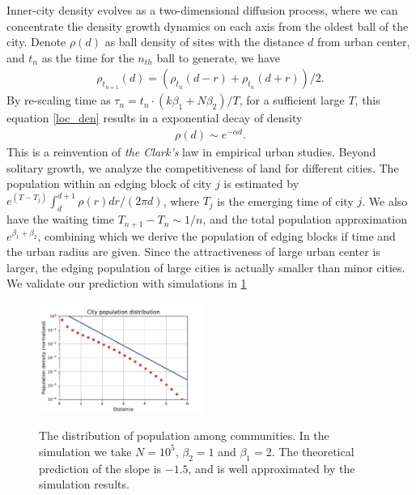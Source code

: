 \documentclass[reprint,unsortedaddress,amsmath,amssymb,floatfix,aps,prl,showkeys]{revtex4-2}
\begin{document}

Inner-city density evolves as a two-dimensional diffusion process, where we can concentrate the density growth dynamics on each axis from the oldest ball of the city. Denote $\rho(d)$ as ball density of sites with the distance $d$ from urban center, and $t_n$ as the time for the $n_{th}$ ball to generate, we have \begin{align}\rho_{t_{n+1}}(d) = (\rho_{t_{n}}(d-r) + \rho_{t_{n}}(d+r) )/2.\label{loc_den}\end{align} By re-scaling time as $\tau_n = t_n\cdot (k\beta_1+N\beta_2)/T$, for a sufficient large $T$, this equation \ref{loc_den} results in a exponential decay of density
    \begin{align}
        \rho(d)\sim e^{-\alpha d}\label{clark_eq}.
    \end{align}
This is a reinvention of \emph{the Clark's} law in empirical urban studies\cite{clark1951urban}. Beyond solitary growth, we analyze the competitiveness of land for different cities. The population within an edging block of city $j$ is estimated by $e^{(T-T_j)}\int_{d}^{d+1}\rho(r)dr/(2\pi d)$, where $T_j$ is the emerging time of city $j$. We also have the waiting time $T_{n+1}-T_{n}\sim 1/n$, and the total population approximation $e^{\beta_1+\beta_2}$, combining which we derive the population of edging blocks if time and the urban radius are given. Since the attractiveness of large urban center is larger, the edging population of large cities is actually smaller than minor cities. We validate our prediction with simulations in \ref{fig:clark} %

\begin{figure}
    \centering
    \includegraphics[width=0.48\textwidth]{pics/kernal_density.pdf}
    \label{fig:clark}
    \caption{The distribution of population among communities. In the simulation we take $N = 10^5$, $\beta_2=1$ and $\beta_1 = 2$. The theoretical prediction of the slope is $-1.5$, and is well approximated by the simulation results.}
\end{figure}
\end{document}
